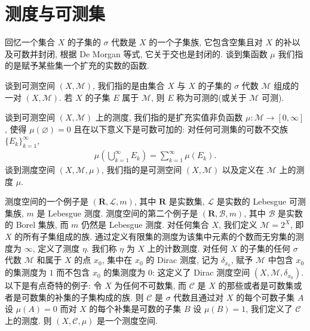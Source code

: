 \documentclass[../../main.tex]{subfiles}
\begin{document}
\section{测度与可测集}\label{section:ch17-measurable-sets}

回忆一个集合 $X$ 的子集的 $\sigma$ 代数是 $X$ 的一个子集族, 它包含空集且对 $X$ 的补以及可数并封闭, 根据 De Morgan 等式, 它关于交也是封闭的. 谈到集函数 $\mu$ 我们指的是赋予某些集一个扩充的实数的函数.

\begin{definition}[可测空间与可测集]\label{definition:ch17-measurable-space}
谈到可测空间 $(X,\mathcal{M})$, 我们指的是由集合 $X$ 与 $X$ 的子集的 $\sigma$ 代数 $\mathcal{M}$ 组成的一对 $(X,\mathcal{M})$. 若 $X$ 的子集 $E$ 属于 $\mathcal{M}$, 则 $E$ 称为可测的(或关于 $\mathcal{M}$ 可测).
\end{definition}

\begin{definition}[测度与测度空间]\label{definition:ch17-measure}
谈到可测空间 $(X,\mathcal{M})$ 上的测度, 我们指的是扩充实值非负函数 $\mu:\mathcal{M}\to[0,\infty]$, 使得 $\mu(\varnothing)=0$ 且在以下意义下是可数可加的: 对任何可测集的可数不交族 $\{E_{k}\}_{k=1}^{\infty}$,
\begin{align*}
\mu\left(\bigcup_{k=1}^{\infty}E_{k}\right)=\sum_{k=1}^{\infty}\mu(E_{k}).
\end{align*}
谈到测度空间 $(X,\mathcal{M},\mu)$, 我们指的是可测空间 $(X,\mathcal{M})$ 以及定义在 $\mathcal{M}$ 上的测度 $\mu$.
\end{definition}

测度空间的一个例子是 $(\mathbf{R},\mathcal{L},m)$, 其中 $\mathbf{R}$ 是实数集, $\mathcal{L}$ 是实数的 Lebesgue 可测集族, $m$ 是 Lebesgue 测度. 测度空间的第二个例子是 $(\mathbf{R},\mathcal{B},m)$, 其中 $\mathcal{B}$ 是实数的 Borel 集族, 而 $m$ 仍然是 Lebesgue 测度. 对任何集合 $X$, 我们定义 $\mathcal{M}=2^{X}$, 即 $X$ 的所有子集组成的族. 通过定义有限集的测度为该集中元素的个数而无穷集的测度为 $\infty$, 定义了测度 $\eta$. 我们称 $\eta$ 为 $X$ 上的计数测度. 对任何 $X$ 的子集的任何 $\sigma$ 代数 $\mathcal{M}$ 和属于 $X$ 的点 $x_{0}$, 集中在 $x_{0}$ 的 Dirac 测度, 记为 $\delta_{x_{0}}$, 赋予 $\mathcal{M}$ 中包含 $x_{0}$ 的集测度为 $1$ 而不包含 $x_{0}$ 的集测度为 $0$: 这定义了 Dirac 测度空间 $(X,\mathcal{M},\delta_{x_{0}})$. 以下是有点奇特的例子: 令 $X$ 为任何不可数集, 而 $\mathcal{C}$ 是 $X$ 的那些或者是可数集或者是可数集的补集的子集构成的族. 则 $\mathcal{C}$ 是 $\sigma$ 代数且通过对 $X$ 的每个可数子集 $A$ 设 $\mu(A)=0$ 而对 $X$ 的每个补集是可数的子集 $B$ 设 $\mu(B)=1$, 我们定义了 $\mathcal{C}$ 上的测度. 则 $(X,\mathcal{C},\mu)$ 是一个测度空间.
\end{document}
